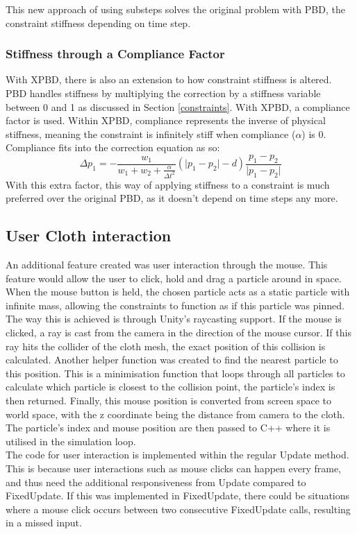 \documentclass[12pt,a4paper]{article}
\begin{document}
This new approach of using substeps solves the original problem with PBD, the constraint stiffness depending on time step. 
\subsubsection{Stiffness through a Compliance Factor}
With XPBD, there is also an extension to how constraint stiffness is altered. PBD handles stiffness by multiplying the correction by a stiffness variable between 0 and 1 as discussed in Section \ref{constraints}. With XPBD, a compliance factor is used. Within XPBD, compliance represents the inverse of physical stiffness, meaning the constraint is infinitely stiff when compliance ($\alpha$) is 0. Compliance fits into the correction equation as so:
\[{\Delta}p_1=-\frac{w_1}{w_1+w_2+\frac{\alpha}{{\Delta}t^2}}(\lvert p_1-p_2 \rvert -d)\frac{p_1-p_2}{\lvert p_1-p_2 \rvert}\] 
With this extra factor, this way of applying stiffness to a constraint is much preferred over the original PBD, as it doesn't depend on time steps any more.
\subsection{User Cloth interaction}
An additional feature created was user interaction through the mouse. This feature would allow the user to click, hold and drag a particle around in space. When the mouse button is held, the chosen particle acts as a static particle with infinite mass, allowing the constraints to function as if this particle was pinned. \\

The way this is achieved is through Unity's raycasting support. If the mouse is clicked, a ray is cast from the camera in the direction of the mouse cursor. If this ray hits the collider of the cloth mesh, the exact position of this collision is calculated. Another helper function was created to find the nearest particle to this position. This is a minimisation function that loops through all particles to calculate which particle is closest to the collision point, the particle's index is then returned. Finally, this mouse position is converted from screen space to world space, with the z coordinate being the distance from camera to the cloth. The particle's index and mouse position are then passed to C++ where it is utilised in the simulation loop. \\

The code for user interaction is implemented within the regular Update method. This is because user interactions such as mouse clicks can happen every frame, and thus need the additional responsiveness from Update compared to FixedUpdate. If this was implemented in FixedUpdate, there could be situations where a mouse click occurs between two consecutive FixedUpdate calls, resulting in a missed input. \\
\end{document}
